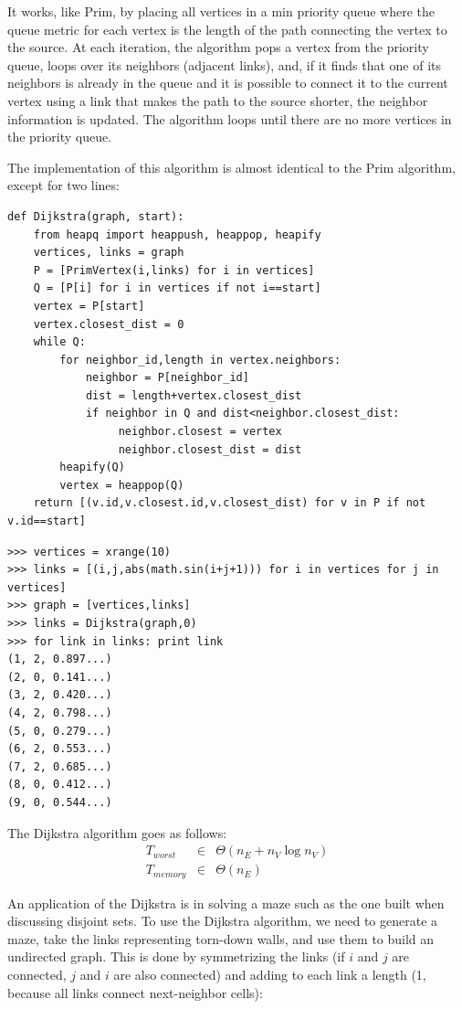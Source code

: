 \documentclass[justified,sixbynine]{tufte-book}
\def\ft{\small\tt}
\theoremstyle{plain}%
\theoremstyle{definition}
\theoremstyle{remark}
\begin{document}
\begin{fullwidth}
It works, like Prim, by placing all vertices in a min priority queue where the queue metric for each vertex is the length of the path connecting the vertex to the source. At each iteration, the algorithm pops a vertex from the priority queue, loops over its neighbors (adjacent links), and, if it finds that one of its neighbors is already in the queue and it is possible to connect it to the current vertex using a link that makes the path to the source shorter, the neighbor information is updated. The algorithm loops until there are no more vertices in the priority queue.

The implementation of this algorithm is almost identical to the Prim algorithm, except for two lines:

\begin{lstlisting}[caption={in file: {\ft nlib.py}}]
def Dijkstra(graph, start):
    from heapq import heappush, heappop, heapify
    vertices, links = graph
    P = [PrimVertex(i,links) for i in vertices]
    Q = [P[i] for i in vertices if not i==start]
    vertex = P[start]
    vertex.closest_dist = 0
    while Q:
        for neighbor_id,length in vertex.neighbors:
            neighbor = P[neighbor_id]
            dist = length+vertex.closest_dist
            if neighbor in Q and dist<neighbor.closest_dist:
                 neighbor.closest = vertex
                 neighbor.closest_dist = dist
        heapify(Q)
        vertex = heappop(Q)
    return [(v.id,v.closest.id,v.closest_dist) for v in P if not v.id==start]
\end{lstlisting}

\begin{lstlisting}[caption={in file: {\ft nlib.py}}]
>>> vertices = xrange(10)
>>> links = [(i,j,abs(math.sin(i+j+1))) for i in vertices for j in vertices]
>>> graph = [vertices,links]
>>> links = Dijkstra(graph,0)
>>> for link in links: print link
(1, 2, 0.897...)
(2, 0, 0.141...)
(3, 2, 0.420...)
(4, 2, 0.798...)
(5, 0, 0.279...)
(6, 2, 0.553...)
(7, 2, 0.685...)
(8, 0, 0.412...)
(9, 0, 0.544...)
\end{lstlisting}

The Dijkstra algorithm goes as follows:
\begin{eqnarray}
T_{worst} &\in &\Theta (n_E+n_V\log n_V) \\
T_{memory} &\in &\Theta (n_E)
\end{eqnarray}

An application of the Dijkstra is in solving a maze such as the one built when discussing disjoint sets. To use the Dijkstra algorithm, we need to generate a maze, take the links representing torn-down walls, and use them to build an undirected graph. This is done by symmetrizing the links (if $i$ and $j$ are connected, $j$ and $i$ are also connected) and adding to each link a length (1, because all links connect next-neighbor cells):



\end{fullwidth}
\end{document}
